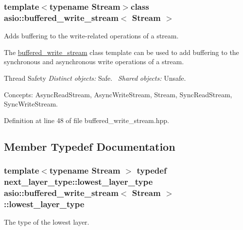 \subsubsection*{template$<$typename Stream$>$class asio\+::buffered\+\_\+write\+\_\+stream$<$ Stream $>$}

Adds buffering to the write-\/related operations of a stream. 

The \hyperlink{classasio_1_1buffered__write__stream}{buffered\+\_\+write\+\_\+stream} class template can be used to add buffering to the synchronous and asynchronous write operations of a stream.

\begin{DoxyParagraph}{Thread Safety}
{\itshape Distinct} {\itshape objects\+:} Safe.~\newline
{\itshape Shared} {\itshape objects\+:} Unsafe.
\end{DoxyParagraph}
\begin{DoxyParagraph}{Concepts\+:}
Async\+Read\+Stream, Async\+Write\+Stream, Stream, Sync\+Read\+Stream, Sync\+Write\+Stream. 
\end{DoxyParagraph}


Definition at line 48 of file buffered\+\_\+write\+\_\+stream.\+hpp.



\subsection{Member Typedef Documentation}
\hypertarget{classasio_1_1buffered__write__stream_af545c11f1e192498c8fa28743590191e}{}
\subsubsection[{lowest\+\_\+layer\+\_\+type}]{\setlength{\rightskip}{0pt plus 5cm}template$<$typename Stream $>$ typedef next\+\_\+layer\+\_\+type\+::lowest\+\_\+layer\+\_\+type {\bf asio\+::buffered\+\_\+write\+\_\+stream}$<$ Stream $>$\+::{\bf lowest\+\_\+layer\+\_\+type}}\label{classasio_1_1buffered__write__stream_af545c11f1e192498c8fa28743590191e}


The type of the lowest layer. 



